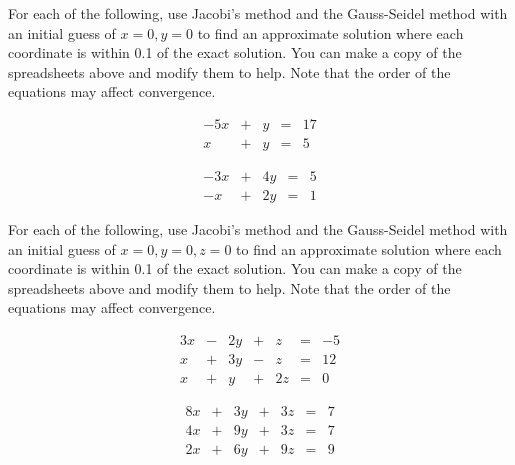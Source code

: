 \documentclass{ximera}
\begin{document}
\begin{problem}%
For each of the following, use Jacobi's method and the Gauss-Seidel method with an initial guess of $x=0,y=0$ to find an approximate solution where each coordinate is within 0.1 of the exact solution.  You can make a copy of the spreadsheets above and modify them to help.  Note that the order of the equations may affect convergence.

\begin{problem}\label{prob:systems-iterative-1}
\begin{equation*}\begin{array}{ccccc}
      -5x& +&y&=&17\\
      x & +&y&= &5 
    \end{array}
\end{equation*}
\end{problem}

\begin{problem}\label{prob:systems-iterative-2}
\begin{equation*}\begin{array}{ccccc}
      -3x& +&4y&=&5\\
      -x & +&2y&= &1 
    \end{array}
\end{equation*}
\end{problem}

\end{problem}

\begin{problem}%
For each of the following, use Jacobi's method and the Gauss-Seidel method with an initial guess of $x=0,y=0, z=0$ to find an approximate solution where each coordinate is within 0.1 of the exact solution.  You can make a copy of the spreadsheets above and modify them to help.  Note that the order of the equations may affect convergence.

\begin{problem}\label{prob:systems-iterative-3x3-1}
\begin{equation*}\begin{array}{ccccccc}
      3x& -&2y&+&z&=&-5\\
      x& +&3y&-&z&=&12\\
      x& +&y&+&2z&=&0
    \end{array}
\end{equation*}
\end{problem}

\begin{problem}\label{prob:systems-iterative-3x3-2}
\begin{equation*}\begin{array}{ccccccc}
      8x& +&3y&+&3z&=&7\\
      4x& +&9y&+&3z&=&7\\
      2x& +&6y&+&9z&=&9
    \end{array}
\end{equation*}
\end{problem}

\end{problem}
\end{document}
